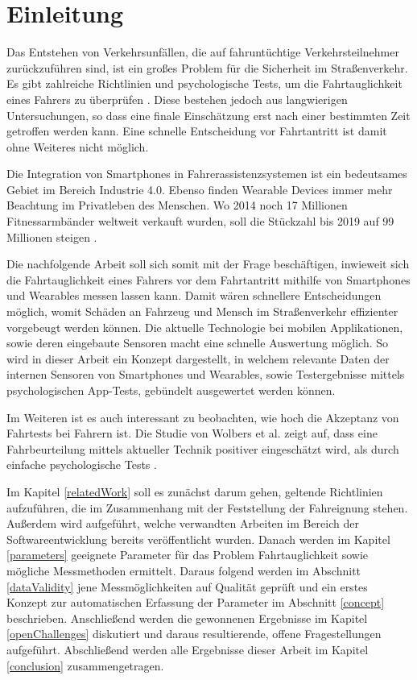 \section{Einleitung}
\label{introduction}

Das Entstehen von Verkehrsunfällen, die auf fahruntüchtige Verkehrsteilnehmer zurückzuführen sind, ist ein großes Problem für die Sicherheit im Straßenverkehr. Es gibt zahlreiche Richtlinien und psychologische Tests, um die Fahrtauglichkeit eines Fahrers zu überprüfen \cite{drivervehiclelicencingagency,testverfahrenpsychometrischefahreignung,begutachtungsrichtlinien,beurteilungskriterien}. Diese bestehen jedoch aus langwierigen Untersuchungen, so dass eine finale Einschätzung erst nach einer bestimmten Zeit getroffen werden kann.  Eine schnelle Entscheidung vor Fahrtantritt ist damit ohne Weiteres nicht möglich.

Die Integration von Smartphones in Fahrerassistenzsystemen ist ein bedeutsames Gebiet im Bereich Industrie 4.0. Ebenso finden Wearable Devices immer mehr Beachtung im Privatleben des Menschen. Wo 2014 noch 17 Millionen Fitnessarmbänder weltweit verkauft wurden, soll die Stückzahl bis 2019 auf 99 Millionen steigen \cite{wearabletracking}. 

Die nachfolgende Arbeit soll sich somit mit der Frage beschäftigen, inwieweit sich die Fahrtauglichkeit eines Fahrers vor dem Fahrtantritt mithilfe von Smartphones und Wearables messen lassen kann. Damit wären schnellere Entscheidungen möglich, womit Schäden an Fahrzeug und Mensch im Straßenverkehr effizienter vorgebeugt werden können. Die aktuelle Technologie bei mobilen Applikationen, sowie deren eingebaute Sensoren macht eine schnelle Auswertung möglich. So wird in dieser Arbeit ein Konzept dargestellt, in welchem relevante Daten der internen Sensoren von Smartphones und Wearables, sowie Testergebnisse mittels psychologischen App-Tests, gebündelt ausgewertet werden können. 

Im Weiteren ist es auch interessant zu beobachten, wie hoch die Akzeptanz von Fahrtests bei Fahrern ist. Die Studie von Wolbers et al. zeigt auf, dass eine Fahrbeurteilung mittels aktueller Technik positiver eingeschätzt wird, als durch einfache psychologische Tests \cite{interaktivefahrsimulation}.

Im Kapitel \ref{relatedWork} soll es zunächst darum gehen, geltende Richtlinien aufzuführen, die im Zusammenhang mit der Feststellung der Fahreignung stehen. Außerdem wird aufgeführt, welche verwandten Arbeiten im Bereich der Softwareentwicklung bereits veröffentlicht wurden. Danach werden im Kapitel \ref{parameters} geeignete Parameter für das Problem Fahrtauglichkeit sowie mögliche Messmethoden ermittelt. Daraus folgend werden im Abschnitt \ref{dataValidity} jene Messmöglichkeiten auf Qualität geprüft und ein erstes Konzept zur automatischen Erfassung der Parameter im Abschnitt \ref{concept} beschrieben. Anschließend werden die gewonnenen Ergebnisse im Kapitel \ref{openChallenges} diskutiert und daraus resultierende, offene Fragestellungen aufgeführt. Abschließend werden alle Ergebnisse dieser Arbeit im Kapitel \ref{conclusion} zusammengetragen.